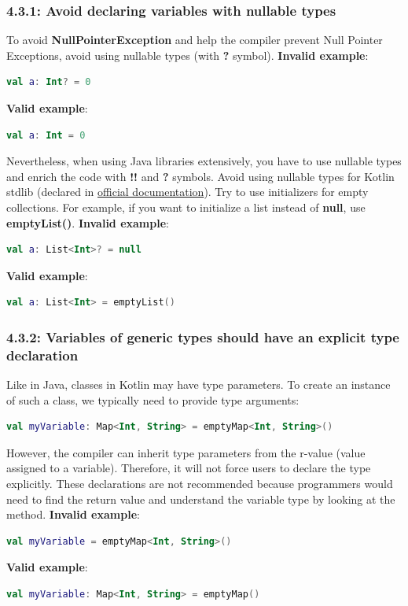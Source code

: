 \subsubsection*{\textbf{4.3.1: Avoid declaring variables with nullable types}}
\leavevmode\newline
\label{sec:4.3.1}
To avoid \textbf{NullPointerException} and help the compiler prevent Null Pointer Exceptions, avoid using nullable types (with \textbf{?} symbol).
\textbf{Invalid example}:
\begin{lstlisting}[language=Kotlin]
val a: Int? = 0
\end{lstlisting}
\textbf{Valid example}:
\begin{lstlisting}[language=Kotlin]
val a: Int = 0
\end{lstlisting}
Nevertheless, when using Java libraries extensively, you have to use nullable types and enrich the code with \textbf{!!} and \textbf{?} symbols.
Avoid using nullable types for Kotlin stdlib (declared in \href{https://kotlinlang.org/api/latest/jvm/stdlib/kotlin.collections/}{official documentation}).
Try to use initializers for empty collections. For example, if you want to initialize a list instead of \textbf{null}, use \textbf{emptyList()}.
\textbf{Invalid example}:
\begin{lstlisting}[language=Kotlin]
val a: List<Int>? = null
\end{lstlisting}
\textbf{Valid example}:
\begin{lstlisting}[language=Kotlin]
val a: List<Int> = emptyList()
\end{lstlisting}
\subsubsection*{\textbf{4.3.2: Variables of generic types should have an explicit type declaration}}
\leavevmode\newline
\label{sec:4.3.2}
Like in Java, classes in Kotlin may have type parameters. To create an instance of such a class, we typically need to provide type arguments:
\begin{lstlisting}[language=Kotlin]
val myVariable: Map<Int, String> = emptyMap<Int, String>()
\end{lstlisting}
However, the compiler can inherit type parameters from the r-value (value assigned to a variable). Therefore, it will not force users to declare the type explicitly.
These declarations are not recommended because programmers would need to find the return value and understand the variable type by looking at the method.
\textbf{Invalid example}:
\begin{lstlisting}[language=Kotlin]
val myVariable = emptyMap<Int, String>()
\end{lstlisting}
\textbf{Valid example}:
\begin{lstlisting}[language=Kotlin]
val myVariable: Map<Int, String> = emptyMap()
\end{lstlisting}

